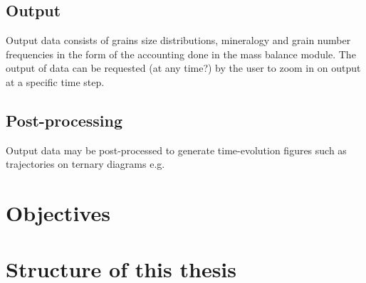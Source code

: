     \subsection{Output}
    Output data consists of grains size distributions, mineralogy and grain number frequencies in the form of the accounting done in the mass balance module. %
    The output of data can be requested (at any time?) by the user to zoom in on output at a specific time step. %

    \subsection{Post-processing}
    Output data may be post-processed to generate time-evolution figures such as trajectories on ternary diagrams e.g. %


\section{Objectives}
\section{Structure of this thesis}








\cleardoublepage

